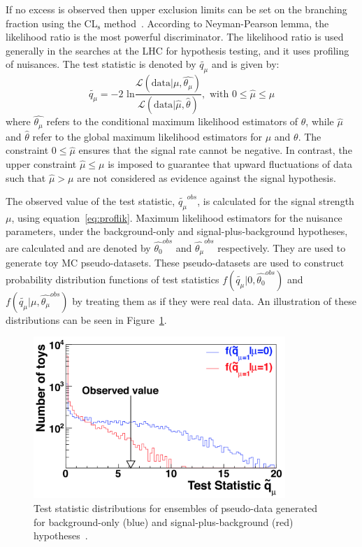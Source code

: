 If no excess is observed then upper exclusion limits can be set on the branching fraction using the CL$_\text{s}$ method~\cite{Read:2002hq, Read:2000ru, Junk:1999kv}. According to Neyman-Pearson lemma, the likelihood ratio is the most powerful discriminator. The likelihood ratio is used generally in the searches at the LHC for hypothesis testing, and it uses profiling of nuisances. The test statistic is denoted by $\tilde{q_\mu}$ and is given by:
\begin{equation}
\label{eq:proflik}
  \tilde{q_\mu}=-2\text{ ln}\frac{\mathcal{L}(\text{data}|\mu,\hat{\theta_\mu})}{\mathcal{L}(\text{data}|\hat{\mu},\hat{\theta})},\text{   with  } 0 \leq \hat{\mu} \leq \mu
\end{equation}
where $\hat{\theta_\mu}$ refers to the conditional maximum likelihood estimators of $\theta$, while $\hat\mu$ and $\hat\theta$ refer to the global maximum likelihood estimators for $\mu$ and $\theta$. The constraint $0 \leq \hat{\mu}$ ensures that the signal rate cannot be negative. In contrast, the upper constraint $\hat{\mu} \leq \mu$ is imposed to guarantee that upward fluctuations of data such that $\hat{\mu} > \mu$ are not considered as evidence against the signal hypothesis.

The observed value of the test statistic, $\tilde{q_\mu}^{obs}$, is calculated for the signal strength $\mu$, using equation~\ref{eq:proflik}. Maximum likelihood estimators for the nuisance parameters, under the background-only and signal-plus-background hypotheses, are calculated and are denoted by $\hat{\theta_{0}}^{obs}$ and $\hat{\theta_\mu}^{obs}$ respectively. They are used to generate toy MC pseudo-datasets. These pseudo-datasets are used to construct probability distribution functions of test statistics $f(\tilde{q_\mu}|0,\hat{\theta_{0}}^{obs})$ and $f(\tilde{q_\mu}|\mu,\hat{\theta_\mu}^{obs})$ by treating them as if they were real data. An illustration of these distributions can be seen in Figure~\ref{fig:test_stat_dist}.
\begin{figure}[!htpb]\centering
 \captionsetup{width=.87\textwidth,justification=centering}
 \includegraphics[width=0.85\textwidth]{plots/chapter8/test_statistic_distri.png}
 \caption{Test statistic distributions for ensembles of pseudo-data generated for background-only (blue) and signal-plus-background (red) hypotheses~\cite{ATLAS:2011tau}.}
 \label{fig:test_stat_dist}
\end{figure}

